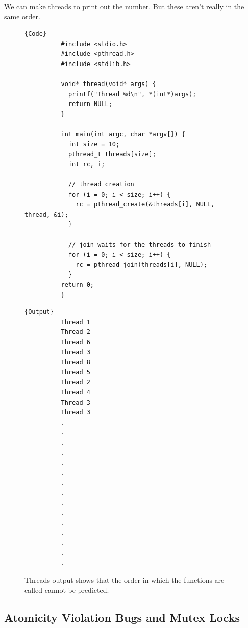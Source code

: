 \documentclass{article}
\begin{document}
    \begin{example}
      We can make threads to print out the number. But these aren't really in the same order. 
      \begin{figure}[H]
        \centering 
        \noindent\begin{minipage}{.8\textwidth}
        \begin{lstlisting}[]{Code}
          #include <stdio.h> 
          #include <pthread.h>
          #include <stdlib.h>

          void* thread(void* args) {
            printf("Thread %d\n", *(int*)args); 
            return NULL; 
          }

          int main(int argc, char *argv[]) {
            int size = 10; 
            pthread_t threads[size]; 
            int rc, i;

            // thread creation 
            for (i = 0; i < size; i++) {
              rc = pthread_create(&threads[i], NULL, thread, &i); 
            }

            // join waits for the threads to finish 
            for (i = 0; i < size; i++) {
              rc = pthread_join(threads[i], NULL); 
            }
          return 0; 
          }
        \end{lstlisting}
        \end{minipage}
        \hfill
        \begin{minipage}{.19\textwidth}
        \begin{lstlisting}[]{Output}
          Thread 1
          Thread 2
          Thread 6
          Thread 3
          Thread 8
          Thread 5
          Thread 2
          Thread 4
          Thread 3
          Thread 3
          .
          .
          .
          .
          .
          .
          .
          .
          .
          .
          .
          .
          .
          .
          .
        \end{lstlisting}
        \end{minipage}
        \caption{Threads output shows that the order in which the functions are called cannot be predicted. } 
        \label{fig:threads}
      \end{figure}
    \end{example}

  \subsection{Atomicity Violation Bugs and Mutex Locks} 
\end{document}
